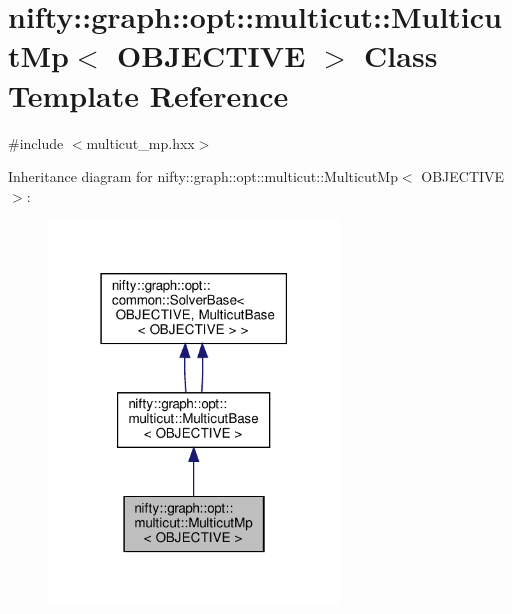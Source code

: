 \hypertarget{classnifty_1_1graph_1_1opt_1_1multicut_1_1MulticutMp}{}\section{nifty\+:\+:graph\+:\+:opt\+:\+:multicut\+:\+:Multicut\+Mp$<$ O\+B\+J\+E\+C\+T\+I\+VE $>$ Class Template Reference}
\label{classnifty_1_1graph_1_1opt_1_1multicut_1_1MulticutMp}


{\ttfamily \#include $<$multicut\+\_\+mp.\+hxx$>$}



Inheritance diagram for nifty\+:\+:graph\+:\+:opt\+:\+:multicut\+:\+:Multicut\+Mp$<$ O\+B\+J\+E\+C\+T\+I\+VE $>$\+:
\nopagebreak
\begin{figure}[H]
\begin{center}
\leavevmode
\includegraphics[width=219pt]{classnifty_1_1graph_1_1opt_1_1multicut_1_1MulticutMp__inherit__graph}
\end{center}
\end{figure}


